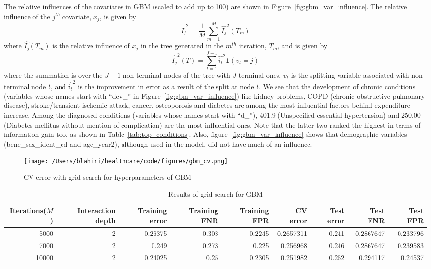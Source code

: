 The relative influences of the covariates in GBM (scaled to add up to 100) are shown in Figure~\ref{fig:gbm_var_influence}. The relative influence of the $j^{th}$ covariate, $x_j$, is given by 
\begin{equation}
\label{eqn:rel_inf_j}
{\hat{I_j}}^2 = \frac{1}{M}\sum_{m=1}^M{{\hat{I_j}}^2(T_m)}
\end{equation}
where $\hat{I_j}(T_m)$ is the relative influence of $x_j$ in the tree generated in the $m^{th}$ iteration, $T_m$, and is given by 
\begin{equation}
\label{eqn:rel_inf_j_T}
{\hat{I_j}}^2(T) = \sum_{t=1}^{J-1}{{\hat{i_t}}^2\mathbf{1}(v_t = j)}
\end{equation}
where the summation is over the $J-1$ non-terminal nodes of the tree with $J$ terminal ones, $v_t$ is the splitting variable associated with non-terminal node $t$, and ${\hat{i_t}}^2$ is the improvement in error as a result of the split at node $t$. We see that the development of chronic conditions (variables whose names start with ``dev\_'' in Figure~\ref{fig:gbm_var_influence}) like kidney problems, COPD (chronic obstructive pulmonary disease), stroke/transient ischemic attack, cancer, osteoporosis and diabetes are among the most influential factors behind expenditure increase. Among the diagnosed conditions (variables whose names start with ``d\_''), 401.9 (Unspecified essential hypertension) and 250.00 (Diabetes mellitus without mention of complication) are the most influential ones. Note that the latter two ranked the highest in terms of information gain too, as shown in Table~\ref{tab:top_conditions}. Also, figure~\ref{fig:gbm_var_influence} shows that demographic variables (bene\_sex\_ident\_cd and age\_year2), although used in the model, did not have much of an influence. 

\begin{figure}[!h]
    \centering
    \texttt{[image: /Users/blahiri/healthcare/code/figures/gbm\_cv.png]}
    \caption{\small CV error with grid search for hyperparameters of GBM}
    \label{fig:gbm_cv}
\end{figure}

\begin{table*}[!h]
\centering
\caption{Results of grid search for GBM}
\begin{tabular}{rrrrrrrrr}
\hline
Iterations($M$) & Interaction depth & Training error & Training FNR & Training FPR & CV error & Test error & Test FNR & Test FPR\\
\hline
5000 & 2 & 0.26375 & 0.303 & 0.2245 & 0.2657311 & 0.241 & 0.2867647 & 0.233796\\
7000 & 2 & 0.249 & 0.273 & 0.225 & 0.256968 & 0.246 & 0.2867647 & 0.239583\\
10000 & 2 & 0.24025 & 0.25 & 0.2305 & 0.251982 & 0.252 & 0.294117 & 0.24537\\
\hline
\end{tabular}
\label{tab:gbm_cv}
\end{table*}

